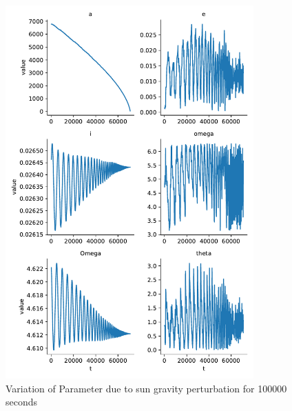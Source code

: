 \begin{figure}[H]
    \centering
    \includegraphics[width=0.85\textwidth]{../Figure/Q2/orbital_elements_variation_sun_100000}
    \caption{Variation of Parameter due to sun gravity perturbation for 100000 seconds}
\end{figure}